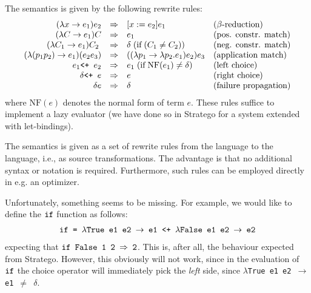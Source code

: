 \documentclass[fleqn]{article}
\newcommand{\ve}[1]{\ensuremath{\text{\tt #1}}}
\newcommand{\vve}[1]{{\tt #1}}
\newcommand{\ra}{\ensuremath{\rightarrow} }
\newcommand{\Ra}{\ensuremath{\Rightarrow} }
\newcommand{\plus}{\ve{ <+ } }
\newcommand{\fail}{\ensuremath{\delta }}
\newcommand{\NF}{\ensuremath{\text{NF}}}
\begin{document}
The semantics is given by the following rewrite rules:
\[
\begin{array}{rcll}
(\lambda x \ra e_1) e_2 & \Ra & [x := e_2] e_1 
  & \text{($\beta$-reduction)} \\

(\lambda C \ra e_1) C & \Ra & e_1
  & \text{(pos. constr. match)} \\

(\lambda C_1 \ra e_1) C_2 \;  & \Ra & \fail \; (\text{if} \; (C_1 \neq C_2))
  & \text{(neg. constr. match)} \\

(\lambda (p_1 p_2) \ra e_1) (e_2 e_3) & \Ra 
  & ((\lambda p_1 \ra \lambda p_2 . e_1) e_2) e_3
  & \text{(application match)} \\

e_1 \plus e_2 & \Ra & e_1 \; (\text{if} \; \NF(e_1) \neq \fail)
  & \text{(left choice)} \\

\fail \plus e & \Ra & e
  & \text{(right choice)} \\

\fail e & \Ra & \fail
  & \text{(failure propagation)} \\

%
%
\end{array}
\]
where $\NF(e)$ denotes the normal form of term $e$.  These rules
suffice to implement a lazy evaluator (we have done so in Stratego 
for a system extended with let-bindings).

The semantics is given as a set of rewrite rules from the language to
the language, i.e., as source transformations.  The advantage is that
no additional syntax or notation is required.  Furthermore, such rules
can be employed directly in e.g. an optimizer.

Unfortunately, something seems to be missing.  For example, we would
like to define the \ve{if} function as follows:
\begin{equation}
\label{ex:ifgood}
\begin{array}{l}
\ve{if = $\lambda$True e1 e2 \ra e1 <+ $\lambda$False e1 e2 \ra e2}
\end{array}
\end{equation}
expecting that \ve{if False 1 2 $\Rightarrow$ 2}.  This is, after all,
the behaviour expected from Stratego.  However, this
obviously will not work, since in the evaluation of \ve{if} the choice
operator will immediately pick the {\em left} side, since
\vve{$\lambda$True e1 e2 \ra e1 $\ne$ \fail}.
\end{document}
